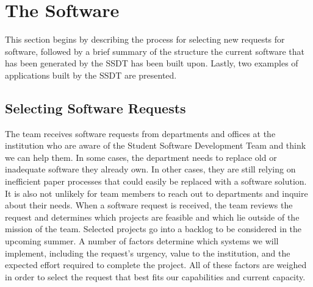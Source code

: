 \section{The Software}
This section begins by describing the process for selecting new requests for software, followed by a brief summary of the structure the current software that has been generated by the SSDT has been built upon. Lastly, two examples of applications built by the SSDT are presented.

\subsection{Selecting Software Requests}
The team receives software requests from departments and offices at the institution who are aware of the Student Software Development Team and think we can help them. In some cases, the department needs to replace old or inadequate software they already own. In other cases, they are still relying on inefficient paper processes that could easily be replaced with a software solution. It is also not unlikely for team members to reach out to departments and inquire about their needs. When a software request is received, the team reviews the request and determines which projects are feasible and which lie outside of the mission of the team. Selected projects go into a backlog to be considered in the upcoming summer. A number of factors determine which systems we will implement, including the request's urgency, value to the institution, and the expected effort required to complete the project. All of these factors are weighed in order to select the request that best fits our capabilities and current capacity.


